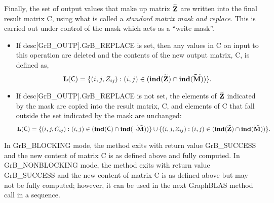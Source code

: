 
Finally, the set of output values that make up matrix ${\bf \widetilde{Z}}$ 
are written into the final result matrix {\sf C}, using what is called
a \emph{standard matrix mask and replace}. 
This is carried out under control of the mask which acts as a ``write mask''.
\begin{itemize}
\item If {\sf desc[GrB\_OUTP].GrB\_REPLACE} is set, then any values in {\sf C} on
input to this operation are deleted and the contents of the new output matrix,
{\sf C}, is defined as,
\[
\bold{L}({\sf C}) = \{(i,j,Z_{ij}) : (i,j) \in (\bold{ind}({\bf \widetilde{Z}}) 
\cap \bold{ind}({\bf \widetilde{M}})) \}. 
\]

\item If {\sf desc[GrB\_OUTP].GrB\_REPLACE} is not set, the elements of 
${\bf \widetilde{Z}}$ indicated by the mask are copied into the result 
matrix, {\sf C}, and elements of {\sf C} that fall outside the set 
indicated by the mask are unchanged:
\[
\bold{L}({\sf C}) = \{(i,j,C_{ij}) : (i,j) \in (\bold{ind}({\sf C}) 
\cap \bold{ind}(\neg {\bf \widetilde{M}})) \} \cup \{(i,j,Z_{ij}) : (i,j) \in 
(\bold{ind}({\bf \widetilde{Z}}) \cap \bold{ind}({\bf \widetilde{M}})) \}.
\]
\end{itemize}

In {\sf GrB\_BLOCKING} mode, the method exits with return value 
{\sf GrB\_SUCCESS} and the new content of matrix {\sf C} is as defined above
and fully computed.
In {\sf GrB\_NONBLOCKING} mode, the method exits with return value 
{\sf GrB\_SUCCESS} and the new content of matrix {\sf C} is as defined above
but may not be fully computed; however, it can be used in the next GraphBLAS 
method call in a sequence.
